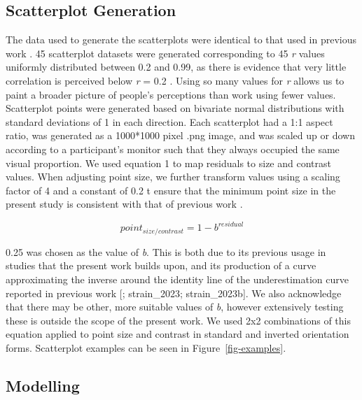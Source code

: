 \documentclass[manuscript, review, anonymous, screen]{acmart}
\begin{document}
\hypertarget{sec-scatter-gen}{%
\subsection{Scatterplot Generation}\label{sec-scatter-gen}}

The data used to generate the scatterplots were identical to that used
in previous work \citep{strain_2023, strain_2023b}. 45 scatterplot
datasets were generated corresponding to 45 \emph{r} values uniformly
distributed between 0.2 and 0.99, as there is evidence that very little
correlation is perceived below \emph{r} = 0.2
\citep{strahan_1978, bobko_1979, cleveland_1982}. Using so many values
for \emph{r} allows us to paint a broader picture of people's
perceptions than work using fewer values. Scatterplot points were
generated based on bivariate normal distributions with standard
deviations of 1 in each direction. Each scatterplot had a 1:1 aspect
ratio, was generated as a 1000*1000 pixel .png image, and was scaled up
or down according to a participant's monitor such that they always
occupied the same visual proportion. We used equation 1 to map residuals
to size and contrast values. When adjusting point size, we further
transform values using a scaling factor of 4 and a constant of 0.2 t
ensure that the minimum point size in the present study is consistent
with that of previous work \citep{strain_2023, strain_2023b}.

\begin{equation}
  point_{size/contrast} = 1 - b^{residual}
\end{equation}

0.25 was chosen as the value of \emph{b}. This is both due to its
previous usage in studies that the present work builds upon, and its
production of a curve approximating the inverse around the identity line
of the underestimation curve reported in previous work
{[}\citet{rensink_2017}; strain\_2023; strain\_2023b{]}. We also
acknowledge that there may be other, more suitable values of \emph{b},
however extensively testing these is outside the scope of the present
work. We used 2x2 combinations of this equation applied to point size
and contrast in standard and inverted orientation forms. Scatterplot
examples can be seen in Figure~\ref{fig-examples}.

\hypertarget{sec-gen-modelling}{%
\subsection{Modelling}\label{sec-gen-modelling}}
\end{document}

